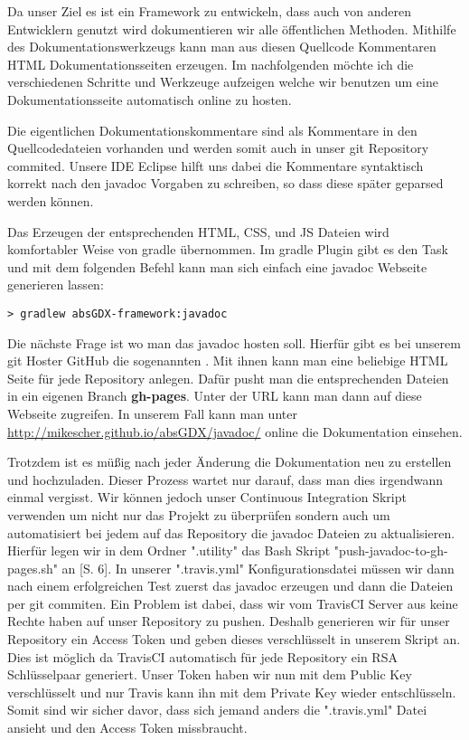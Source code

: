 
Da unser Ziel es ist ein Framework zu entwickeln, dass auch von anderen Entwicklern genutzt wird dokumentieren wir alle öffentlichen Methoden. Mithilfe des Dokumentationswerkzeugs  kann man aus diesen Quellcode Kommentaren HTML Dokumentationsseiten erzeugen. Im nachfolgenden möchte ich die verschiedenen Schritte und Werkzeuge aufzeigen welche wir benutzen um eine Dokumentationsseite automatisch online zu hosten.

Die eigentlichen Dokumentationskommentare sind als Kommentare in den Quellcodedateien vorhanden und werden somit auch in unser git Repository commited. Unsere IDE Eclipse hilft uns dabei die Kommentare syntaktisch korrekt nach den javadoc Vorgaben zu schreiben, so dass diese später geparsed werden können.

Das Erzeugen der entsprechenden HTML, CSS, und JS Dateien wird komfortabler Weise von gradle übernommen. Im gradle Plugin  gibt es den Task  und mit dem folgenden Befehl kann man sich einfach eine javadoc Webseite generieren lassen: 

\doinlineII
\begin{lstlisting}[caption=Gradle in der Kommandozeile, title=\hspace{0 pt}, style=cmd]
> gradlew absGDX-framework:javadoc
\end{lstlisting}

Die nächste Frage ist wo man das javadoc hosten soll. Hierfür gibt es bei unserem git Hoster GitHub die sogenannten . Mit ihnen kann man eine beliebige HTML Seite für jede Repository anlegen. Dafür pusht man die entsprechenden Dateien in ein eigenen Branch \textbf{gh-pages}. Unter der URL  kann man dann auf diese Webseite zugreifen. In unserem Fall kann man unter \href{http://mikescher.github.io/absGDX/javadoc/}{http://mikescher.github.io/absGDX/javadoc/} online die Dokumentation einsehen.

Trotzdem ist es müßig nach jeder Änderung die Dokumentation neu zu erstellen und hochzuladen. Dieser Prozess wartet nur darauf, dass man dies irgendwann einmal vergisst.
Wir können jedoch unser Continuous Integration Skript verwenden um nicht nur das Projekt zu überprüfen sondern auch um automatisiert bei jedem  auf das Repository die javadoc Dateien zu aktualisieren.
Hierfür legen wir in dem Ordner ".utility" das Bash Skript "push-javadoc-to-gh-pages.sh" an \cite{BASH}[S. 6]. In unserer ".travis.yml" Konfigurationsdatei müssen wir dann nach einem erfolgreichen Test zuerst das javadoc erzeugen und dann die Dateien per git commiten. Ein Problem ist dabei, dass wir vom TravisCI Server aus keine Rechte haben auf unser Repository zu pushen. Deshalb generieren wir für unser Repository ein Access Token und geben dieses verschlüsselt in unserem Skript an. Dies ist möglich da TravisCI automatisch für jede Repository ein RSA Schlüsselpaar generiert. Unser Token haben wir nun mit dem Public Key verschlüsselt und nur Travis kann ihn mit dem Private Key wieder entschlüsseln. Somit sind wir sicher davor, dass sich jemand anders die  ".travis.yml" Datei ansieht und den Access Token missbraucht.

